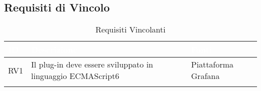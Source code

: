 \subsection{Requisiti di Vincolo}\label{RV}
\begin{center}
\begin{longtable}[c]{|m{}|m{}|m{}|}
\hline
\rowcolor{bluelogo}\textbf{\textcolor{white}{ID}} & \textbf{\textcolor{white}{Descrizione}} & \textbf{\textcolor{white}{Fonti}}\\
\hline \hline
\endfirsthead
RV1 & Il plug-in deve essere sviluppato in linguaggio ECMAScript6 & Piattaforma Grafana\\
\hline
\caption{Requisiti Vincolanti}
\end{longtable}
\end{center}